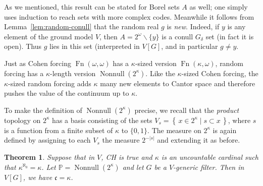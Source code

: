 \documentclass[11pt,oneside]{amsbook}
\newcommand{\set}[1]{\left\{\,#1\,\right\}}
\newcommand{\PP}{\mathbb P}
\DeclareMathOperator{\Fn}{Fn}
\DeclareMathOperator{\Nonnull}{Nonnull}
\theoremstyle{definition}
\theoremstyle{plain}
\newtheorem{theorem}{Theorem}[section]
\theoremstyle{definition}
\theoremstyle{remark}
\numberwithin{equation}{section}
\numberwithin{figure}{section}
\begin{document}
As we mentioned, this result can be stated for Borel sets $A$ as well; one simply uses induction to reach sets with more complex codes. Meanwhile it follows from Lemma~\ref{lem:random-conull} that the random real $g$ is \emph{new}. Indeed, if $y$ is any element of the ground model $V$, then $A=2^\omega\smallsetminus\{y\}$ is a conull $G_\delta$ set (in fact it is open). Thus $g$ lies in this set (interpreted in $V[G]$, and in particular $g\neq y$.

Just as Cohen forcing $\Fn(\omega,\omega)$ has a $\kappa$-sized version $\Fn(\kappa,\omega)$, random forcing has a $\kappa$-length version $\Nonnull(2^\kappa)$. Like the $\kappa$-sized Cohen forcing, the $\kappa$-sized random forcing adds $\kappa$ many new elements to Cantor space and therefore pushes the value of the continuum up to $\kappa$.

To make the definition of $\Nonnull(2^\kappa)$ precise, we recall that the \emph{product} topology on $2^\kappa$ has a basis consisting of the sets $V_s=\set{x\in2^\kappa\mid s\subset x}$, where $s$ is a function from a finite subset of $\kappa$ to $\{0,1\}$. The measure on $2^\kappa$ is again defined by assigning to each $V_s$ the measure $2^{-|s|}$ and extending it as before.

\begin{theorem}
  Suppose that in $V$, CH is true and $\kappa$ is an uncountable cardinal such that $\kappa^{\aleph_0}=\kappa$. Let $\PP=\Nonnull(2^\kappa)$ and let $G$ be a $V$-generic filter. Then in $V[G]$, we have $\mathfrak c=\kappa$.
\end{theorem}
\end{document}
